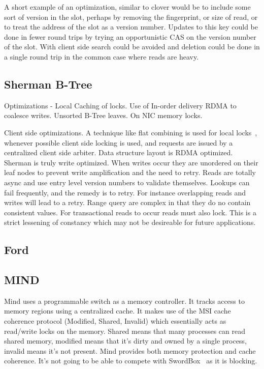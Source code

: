 A short example of an optimization, similar to clover would be to include some
sort of version in the slot, perhaps by removing the fingerprint, or size of
read, or to treat the address of the slot as a version number. Updates to this
key could be done in fewer round trips by trying an opportunistic CAS on the
version number of the slot. With client side search could be avoided and
deletion could be done in a single round trip in the common case where reads are
heavy.



\subsection{Sherman B-Tree}
Optimizations - Local Caching of locks. Use of In-order delivery RDMA to
coalesce writes. Unsorted B-Tree leaves. On NIC memory locks.

Client side optimizations. A technique like flat combining is used for local
locks~\cite{flat-combine}, whenever possible client side locking is used, and
requests are issued by a centralized client side arbiter. Data structure layout
is RDMA optimized. Sherman is truly write optimized. When writes occur they are
unordered on their leaf nodes to prevent write amplification and the need to
retry. Reads are totally async and use entry level version numbers to validate
themselves. Lookups can fail frequently, and the remedy is to retry. For
instance overlapping reads and writes will lead to a retry. Range query are
complex in that they do no contain consistent values. For transactional reads to
occur reads must also lock. This is a strict lessening of constancy which may
not be desireable for future applications.

\subsection{Ford}

\subsection{MIND~\cite{mind}}

Mind uses a programmable switch as a memory controller. It tracks access to
memory regions using a centralized cache. It makes use of the MSI cache
coherence protocol (Modified, Shared, Invalid) which essentially acts as
read/write locks on the memory. Shared means that many processes can read shared
memory, modified means that it's dirty and owned by a single process, invalid
means it's not present. Mind provides both memory protection and cache
coherence. It's not going to be able to compete with
SwordBox~\cite{Grant2021InContRes} as it is blocking.

